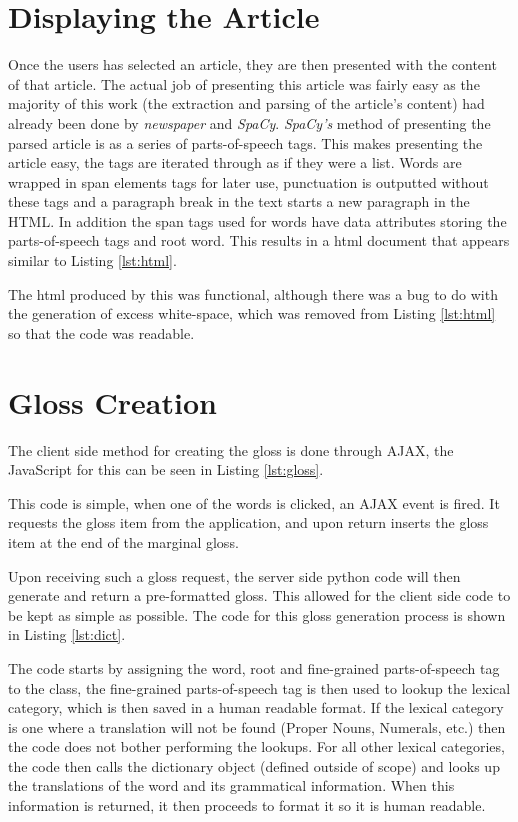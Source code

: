 \section{Displaying the Article}

Once the users has selected an article, they are then presented with the content of that article. The actual job of presenting this article was fairly easy as the majority of this work (the extraction and parsing of the article's content) had already been done by \textit{newspaper} and \textit{SpaCy}. \textit{SpaCy's} method of presenting the parsed article is as a series of parts-of-speech tags. This makes presenting the article easy, the tags are iterated through as if they were a list. Words are wrapped in span elements tags for later use, punctuation is outputted without these tags and a paragraph break in the text starts a new paragraph in the HTML. In addition the span tags used for words have data attributes storing the parts-of-speech tags and root word. This results in a html document that appears similar to Listing \ref{lst:html}.



The html produced by this was functional, although there was a bug to do with the generation of excess white-space, which was removed from Listing \ref{lst:html} so that the code was readable. 

\section{Gloss Creation}

The client side method for creating the gloss is done through AJAX, the JavaScript for this can be seen in Listing \ref{lst:gloss}.



This code is simple, when one of the words is clicked, an AJAX event is fired. It requests the gloss item from the application, and upon return inserts the gloss item at the end of the marginal gloss.

Upon receiving such a gloss request, the server side python code will then generate and return a pre-formatted gloss. This allowed for the client side code to be kept as simple as possible. The code for this gloss generation process is shown in Listing \ref{lst:dict}.



The code starts by assigning the word, root and fine-grained parts-of-speech tag to the class, the fine-grained parts-of-speech tag is then used to lookup the lexical category, which is then saved in a human readable format.  If the lexical category is one where a translation will not be found (Proper Nouns, Numerals, etc.) then the code does not bother performing the lookups. For all other lexical categories, the code then calls the dictionary object (defined outside of scope) and looks up the translations of the word and its grammatical information. When this information is returned, it then proceeds to format it so it is human readable.

